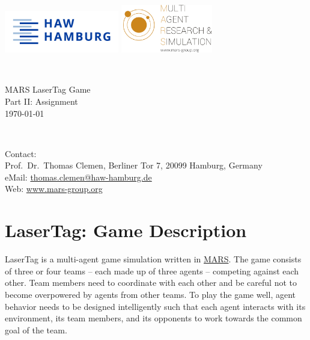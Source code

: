 \documentclass[a4paper,english,DIV=16,11pt,parskip=half,dvipsnames,listof=totoc,index=totoc,bibliography=totoc]{scrartcl}
\begin{document}
	
\begin{titlepage}		
	\begin{minipage}{\textwidth}
		\noindent
		\includegraphics[width=5cm]{../logos/HAW_Hamburg.jpeg}
		\hfill
		\includegraphics[width=4cm]{../logos/mars_logo.png}
	\end{minipage}\\
		
	\vspace{5cm}
		
	\begin{minipage}{\textwidth}
		\noindent
		\centering
		{\huge MARS LaserTag Game}\\[0.5cm]
		{\LARGE Part II: Assignment}\\[0.5cm]
		{\large \textsf{\today}}
	\end{minipage}\\
		
	\vfill
		
	\begin{framed}
		\begin{minipage}{\textwidth}
			Contact:\\ Prof.~Dr.~Thomas Clemen, Berliner Tor 7, 20099 Hamburg, Germany\\
			eMail: \href{mailto:thomas.clemen@haw-hamburg.de}{thomas.clemen@haw-hamburg.de}\\
			Web: \url{www.mars-group.org}
		\end{minipage}
			
	\end{framed}
\end{titlepage}

\section*{LaserTag: Game Description}
LaserTag is a multi-agent game simulation written in \href{https://mars-group-haw.github.io/index.html}{MARS}. The game consists of three or four teams -- each made up of three agents -- competing against each other. Team members need to coordinate with each other and be careful not to become overpowered by agents from other teams. To play the game well, agent behavior needs to be designed intelligently such that each agent interacts with its environment, its team members, and its opponents to work towards the common goal of the team.
\end{document}
